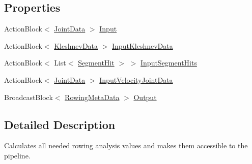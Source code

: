\subsection*{Properties}
\begin{DoxyCompactItemize}
\item 
Action\+Block$<$ \hyperlink{struct_rowing_monitor_1_1_model_1_1_util_1_1_joint_data}{Joint\+Data} $>$ \hyperlink{class_rowing_monitor_1_1_model_1_1_pipeline_1_1_rowing_meta_data_calculator_afb7cb4aa5c2cd60bd77407ff7b14e436}{Input}
\item 
Action\+Block$<$ \hyperlink{struct_rowing_monitor_1_1_model_1_1_pipeline_1_1_kleshnev_data}{Kleshnev\+Data} $>$ \hyperlink{class_rowing_monitor_1_1_model_1_1_pipeline_1_1_rowing_meta_data_calculator_a2f5893ac20a7f23bd3ee75114d0192b4}{Input\+Kleshnev\+Data}
\item 
Action\+Block$<$ List$<$ \hyperlink{struct_rowing_monitor_1_1_model_1_1_util_1_1_segment_hit}{Segment\+Hit} $>$ $>$ \hyperlink{class_rowing_monitor_1_1_model_1_1_pipeline_1_1_rowing_meta_data_calculator_aeb9c1c4d50032138bba36996c1bed23a}{Input\+Segment\+Hits}
\item 
Action\+Block$<$ \hyperlink{struct_rowing_monitor_1_1_model_1_1_util_1_1_joint_data}{Joint\+Data} $>$ \hyperlink{class_rowing_monitor_1_1_model_1_1_pipeline_1_1_rowing_meta_data_calculator_abc9554152134ffbecb285cbef206929e}{Input\+Velocity\+Joint\+Data}
\item 
Broadcast\+Block$<$ \hyperlink{struct_rowing_monitor_1_1_model_1_1_util_1_1_rowing_meta_data}{Rowing\+Meta\+Data} $>$ \hyperlink{class_rowing_monitor_1_1_model_1_1_pipeline_1_1_rowing_meta_data_calculator_ad3df3f9628998716d78822a6cd424a62}{Output}
\end{DoxyCompactItemize}


\subsection{Detailed Description}
Calculates all needed rowing analysis values and makes them accessible to the pipeline. 



